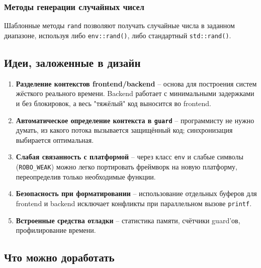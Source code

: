 \documentclass[a4paper,12pt]{article}
\begin{document}
\subsubsection{Методы генерации случайных чисел}

Шаблонные методы \texttt{rand} позволяют получать случайные числа в заданном диапазоне, используя либо \texttt{env::rand()}, либо стандартный \texttt{std::rand()}.

\subsection{Идеи, заложенные в дизайн}

\begin{enumerate}
    \item \textbf{Разделение контекстов frontend/backend} -- основа для построения систем жёсткого реального времени. Backend работает с минимальными задержками и без блокировок, а весь "тяжёлый" код выносится во frontend.
    \item \textbf{Автоматическое определение контекста в \texttt{guard}} -- программисту не нужно думать, из какого потока вызывается защищённый код; синхронизация выбирается оптимальная.
    \item \textbf{Слабая связанность с платформой} -- через класс \texttt{env} и слабые символы (\texttt{ROBO\_WEAK}) можно легко портировать фреймворк на новую платформу, переопределив только необходимые функции.
    \item \textbf{Безопасность при форматировании} -- использование отдельных буферов для frontend и backend исключает конфликты при параллельном вызове \texttt{printf}.
    \item \textbf{Встроенные средства отладки} -- статистика памяти, счётчики guard'ов, профилирование времени.
\end{enumerate}

\subsection{Что можно доработать}
\end{document}
